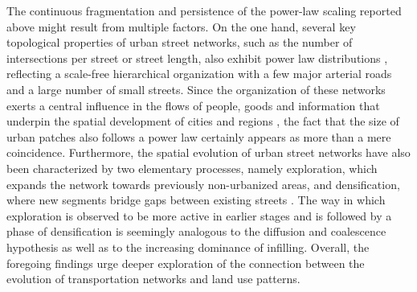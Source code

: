 \documentclass[10pt,letterpaper]{article}
\begin{document}
The continuous fragmentation and persistence of the power-law scaling reported above might result from multiple factors.
On the one hand, several key topological properties of urban street networks, such as the number of intersections per street or street length, also exhibit power law distributions \cite{jiang2007topological}, reflecting a scale-free hierarchical organization with a few major arterial roads and a large number of small streets.
Since the organization of these networks exerts a central influence in the flows of people, goods and information that underpin the spatial development of cities and regions \cite{bettencourt2007growth, batty2008size}, the fact that the size of urban patches also follows a power law certainly appears as more than a mere coincidence. %
Furthermore, the spatial evolution of urban street networks have also been characterized by two elementary processes, namely exploration, which expands the network towards previously non-urbanized areas, and densification, where new segments bridge gaps between existing streets \cite{strano2012elementary}.
The way in which exploration is observed to be more active in earlier stages and is followed by a phase of densification is seemingly analogous to the diffusion and coalescence hypothesis as well as to the increasing dominance of infilling.
Overall, the foregoing findings urge deeper exploration of the connection between the evolution of transportation networks and land use patterns.
\end{document}
